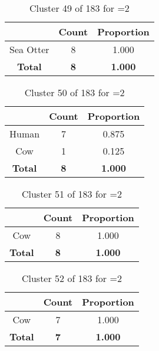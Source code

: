 \begin{table}[ht!]
\centering
\begin{tabular}{|c|c|c|}
\hline
\bf \Spec{} &\bf Count &\bf Proportion\\ \hline \hline
Sea Otter & 8 & 1.000\\ \hline
\hline
\bf Total & \bf 8 & \bf 1.000\\ \hline
\end{tabular}
\label{tab:cluster:49:2}
\caption{Cluster 49 of 183 for \minneigh{}=2}
\end{table}

\clearpage
\begin{table}[ht!]
\centering
\begin{tabular}{|c|c|c|}
\hline
\bf \Spec{} &\bf Count &\bf Proportion\\ \hline \hline
Human & 7 & 0.875\\ \hline
Cow & 1 & 0.125\\ \hline
\hline
\bf Total & \bf 8 & \bf 1.000\\ \hline
\end{tabular}
\label{tab:cluster:50:2}
\caption{Cluster 50 of 183 for \minneigh{}=2}
\end{table}

\begin{table}[ht!]
\centering
\begin{tabular}{|c|c|c|}
\hline
\bf \Spec{} &\bf Count &\bf Proportion\\ \hline \hline
Cow & 8 & 1.000\\ \hline
\hline
\bf Total & \bf 8 & \bf 1.000\\ \hline
\end{tabular}
\label{tab:cluster:51:2}
\caption{Cluster 51 of 183 for \minneigh{}=2}
\end{table}

\begin{table}[ht!]
\centering
\begin{tabular}{|c|c|c|}
\hline
\bf \Spec{} &\bf Count &\bf Proportion\\ \hline \hline
Cow & 7 & 1.000\\ \hline
\hline
\bf Total & \bf 7 & \bf 1.000\\ \hline
\end{tabular}
\label{tab:cluster:52:2}
\caption{Cluster 52 of 183 for \minneigh{}=2}
\end{table}

